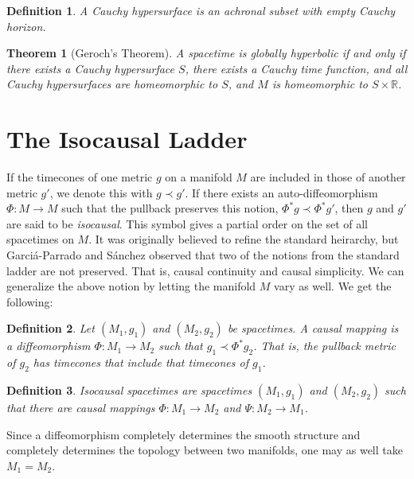 \documentclass{article}
\theoremstyle{plain}
\newtheorem{theorem}{Theorem}[section]
\theoremstyle{thmit}
\theoremstyle{normal}
\newtheorem{definition}{Definition}[section]
\begin{document}
        \begin{definition}
            A Cauchy hypersurface is an achronal subset with empty
            Cauchy horizon.
        \end{definition}
        \begin{theorem}[Geroch's Theorem]
            A spacetime is globally hyperbolic if and only if there exists a
            Cauchy hypersurface $S$, there exists a Cauchy time function, and
            all Cauchy hypersurfaces are homeomorphic to $S$, and $M$ is
            homeomorphic to $S\times\mathbb{R}$.
        \end{theorem}
    \section{The Isocausal Ladder}
        If the timecones of one metric $g$ on a manifold $M$ are included in
        those of another metric $g'$, we denote this with
        $g\prec{g}'$. If there exists an auto-diffeomorphism
        $\Phi:M\rightarrow{M}$ such that the pullback preserves this notion,
        $\Phi^{*}g\prec\Phi^{*}g'$, then $g$ and $g'$ are said to be
        \textit{isocausal}. This symbol gives a partial order on the set of
        all spacetimes on $M$. It was originally believed to refine the standard
        heirarchy, but Garci\'{a}-Parrado and S\'{a}nchez observed that two of
        the notions from the standard ladder are not preserved. That is,
        causal continuity and causal simplicity. We can generalize the above
        notion by letting the manifold $M$ vary as well. We get the following:
        \begin{definition}
            Let $(M_{1},g_{1})$ and $(M_{2},g_{2})$ be spacetimes. A causal
            mapping is a diffeomorphism $\Phi:M_{1}\rightarrow{M}_{2}$ such that
            $g_{1}\prec\Phi^{*}g_{2}$. That is, the pullback metric of $g_{2}$
            has timecones that include that timecones of $g_{1}$.
        \end{definition}
        \begin{definition}
            Isocausal spacetimes are spacetimes $(M_{1},g_{1})$ and
            $(M_{2},g_{2})$ such that there are causal mappings
            $\Phi:M_{1}\rightarrow{M}_{2}$ and $\Psi:M_{2}\rightarrow{M}_{1}$.
        \end{definition}
        Since a diffeomorphism completely determines the smooth structure
        and completely determines the topology between two manifolds, one may
        as well take $M_{1}=M_{2}$.
\end{document}
